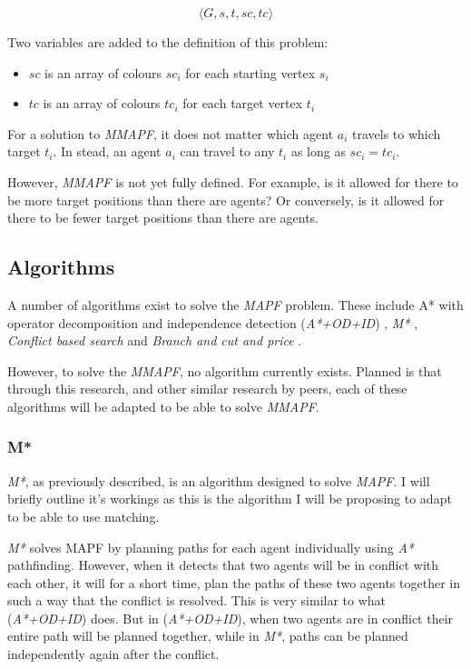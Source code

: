 \documentclass[english]{article}
\begin{document}
$$
\langle G, s, t, sc, tc \rangle
$$

Two variables are added to the definition of this problem:

\begin{itemize}
    \item $sc$ is an array of colours $sc_i$ for each starting vertex $s_i$
    \item $tc$ is an array of colours $tc_i$ for each target vertex $t_i$
\end{itemize}

For a solution to \textit{MMAPF}, it does not matter which agent $a_i$ travels to which target $t_i$. In stead, an agent $a_i$ can travel to any $t_i$ as long as $sc_i = tc_i$.

However, \textit{MMAPF} is not yet fully defined. For example, is it allowed for there to be more target positions than there are agents? Or conversely, is it allowed for there to be fewer target positions than there are agents.

\subsection{Algorithms}

A number of algorithms exist to solve the \textit{MAPF} problem. These include A* with operator decomposition and independence detection (\textit{A*+OD+ID}) \cite{AStarIDOD_standley_2010}, \textit{M*} \cite{mstar_wagner_2011}, \textit{Conflict based search} \cite{conflict_based_search_sharon_2015} and \textit{Branch and cut and price} \cite{bcp_lam_2019}. 

However, to solve the \textit{MMAPF}, no algorithm currently exists. Planned is that through this research, and other similar research by peers, each of these algorithms will be adapted to be able to solve \textit{MMAPF}.

\subsubsection*{M*}

\textit{M*}, as previously described, is an algorithm designed to solve \textit{MAPF}. I will briefly outline it's workings as this is the algorithm I will be proposing to adapt to be able to use matching. 

\textit{M*} solves MAPF by planning paths for each agent individually using \textit{A*} pathfinding. However, when it detects that two agents will be in conflict with each other, it will for a short time, plan the paths of these two agents together in such a way that the conflict is resolved. This is very similar to what (\textit{A*+OD+ID}) does. But in (\textit{A*+OD+ID}), when two agents are in conflict their entire path will be planned together, while in \textit{M*}, paths can be planned independently again after the conflict.
\end{document}
